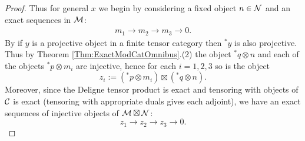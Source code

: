 \documentclass{amsart}
\begin{document}
\begin{proof}
Thus for general $x$ we begin by considering a fixed object $n \in \mathcal N$ and an exact sequences in $\mathcal M$:
\begin{align*}
	m_1 \to m_2 \to m_3 \to 0. 
\end{align*}
By \cite[Prop. 2.3]{EO-ftc} if $y$ is a projective object in a finite tensor category then ${}^*y$ is also projective. Thus by Theorem \ref{Thm:ExactModCatOmnibus}.(2) the object ${}^*q \otimes n$ and each of the objects ${}^*p \otimes m_i$ are injective, hence for each $i = 1,2,3$ so is the object 
\begin{equation*}
	z_{i} :=  ({}^*p \otimes m_i) \boxtimes ({}^*q \otimes n).
\end{equation*}
Moreover, since the Deligne tensor product is exact and tensoring with objects of $\mathcal C$ is exact (tensoring with appropriate duals gives each adjoint), we have an exact sequences of injective objects of $\mathcal M \boxtimes \mathcal N$:
\begin{equation*}
	z_1 \to z_2 \to z_3 \to 0.
\end{equation*}


\end{proof}
\end{document}
